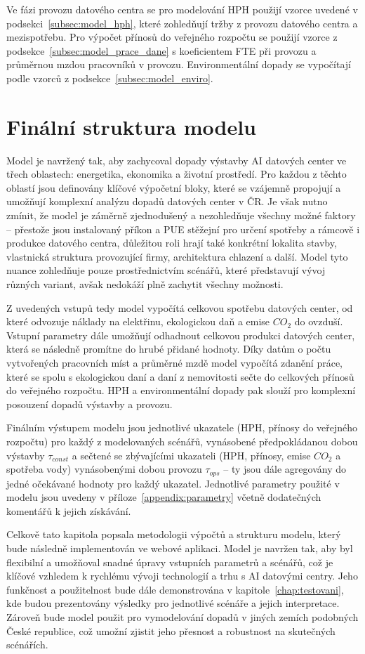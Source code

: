 Ve fázi provozu datového centra se pro modelování HPH použijí vzorce uvedené v podsekci~\ref{subsec:model_hph}, které zohledňují tržby z provozu datového centra a mezispotřebu. Pro výpočet přínosů do veřejného rozpočtu se použijí vzorce z podsekce~\ref{subsec:model_prace_dane} s koeficientem FTE při provozu a průměrnou mzdou pracovníků v provozu. Environmentální dopady se vypočítají podle vzorců z podsekce~\ref{subsec:model_enviro}.

\section{Finální struktura modelu}
\label{sec:model_struktura}

Model je navržený tak, aby zachycoval dopady výstavby AI datových center ve třech oblastech: energetika, ekonomika a životní prostředí. Pro každou z těchto oblastí jsou definovány klíčové výpočetní bloky, které se vzájemně propojují a umožňují komplexní analýzu dopadů datových center v ČR. Je však nutno zmínit, že model je záměrně zjednodušený a nezohledňuje všechny možné faktory -- přestože jsou instalovaný příkon a PUE stěžejní pro určení spotřeby a rámcově i produkce datového centra, důležitou roli hrají také konkrétní lokalita stavby, vlastnická struktura provozující firmy, architektura chlazení a další. Model tyto nuance zohledňuje pouze prostřednictvím scénářů, které představují vývoj různých variant, avšak nedokáží plně zachytit všechny možnosti.

Z uvedených vstupů tedy model vypočítá celkovou spotřebu datových center, od které odvozuje náklady na elektřinu, ekologickou daň a emise $CO_2$ do ovzduší. Vstupní parametry dále umožňují odhadnout celkovou produkci datových center, která se následně promítne do hrubé přidané hodnoty. Díky datům o počtu vytvořených pracovních míst a průměrné mzdě model vypočítá zdanění práce, které se spolu s ekologickou daní a daní z nemovitosti sečte do celkových přínosů do veřejného rozpočtu. HPH a environmentální dopady pak slouží pro komplexní posouzení dopadů výstavby a provozu.

Finálním výstupem modelu jsou jednotlivé ukazatele (HPH, přínosy do veřejného rozpočtu) pro každý z modelovaných scénářů, vynásobené předpokládanou dobou výstavby $\tau_{const}$ a sečtené se zbývajícími ukazateli (HPH, přínosy, emise $CO_2$ a spotřeba vody) vynásobenými dobou provozu $\tau_{ops}$ -- ty jsou dále agregovány do jedné očekávané hodnoty pro každý ukazatel. Jednotlivé parametry použité v modelu jsou uvedeny v příloze~\ref{appendix:parametry} včetně dodatečných komentářů k jejich získávání.

Celkově tato kapitola popsala metodologii výpočtů a strukturu modelu, který bude následně implementován ve webové aplikaci. Model je navržen tak, aby byl flexibilní a umožňoval snadné úpravy vstupních parametrů a scénářů, což je klíčové vzhledem k rychlému vývoji technologií a trhu s AI datovými centry. Jeho funkčnost a použitelnost bude dále demonstrována v kapitole~\ref{chap:testovani}, kde budou prezentovány výsledky pro jednotlivé scénáře a jejich interpretace. Zároveň bude model použit pro vymodelování dopadů v jiných zemích podobných České republice, což umožní zjistit jeho přesnost a robustnost na skutečných scénářích.